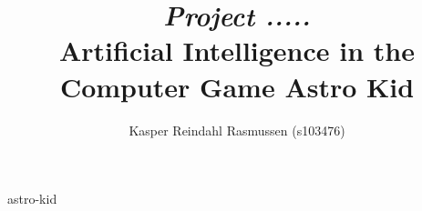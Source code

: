 \documentclass[10pt,a4paper,english,final]{article} %
\author{Kasper Reindahl Rasmussen (s103476)}
\title{\textit{Project .....}\\
	\textbf{Artificial Intelligence in the Computer Game Astro Kid}
}
\begin{document}
\maketitle

\tableofcontents


\printglossaries
\gls{astro-kid}








\end{document}
